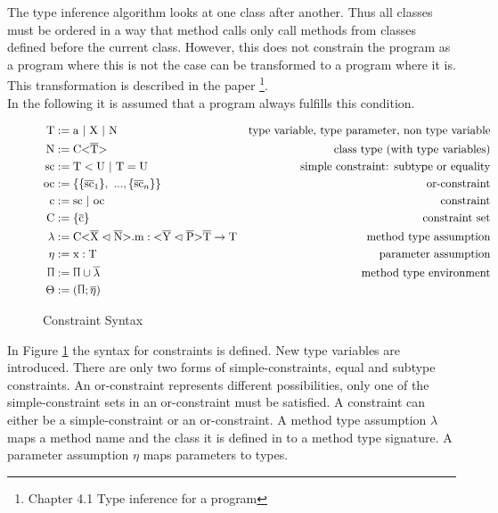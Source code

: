 The type inference algorithm looks at one class after another. Thus all classes must be ordered in a way that method calls only call methods from classes defined before the current class.
However, this does not constrain the program as a program where this is not the case can be transformed to a program where it is.
This transformation is described in the paper \footnote{Chapter 4.1 Type inference for a program}.
\\
In the following it is assumed that a program always fulfills this condition.

\begin{figure}
    \begin{align*}
        \text{T} &:= \text{a} \ | \ \text{X} \ | \ \text{N} &\text{type variable, type parameter, non type variable} \\
        \text{N} &:= \text{C} \vv{\ot{T}} &\text{class type (with type variables)}\\
        \text{sc} &:= \text{T} < \text{U} \ | \ \text{T} = \text{U} &\text{simple constraint: subtype or equality}\\
        \text{oc} &:= \{ \{ \ot{sc}_1 \}, \ ..., \{ \ot{sc}_n \} \} &\text{or-constraint}\\
        \text{c} &:= \text{sc} \ | \ \text{oc} &\text{constraint}\\
        \text{C} &:= \{ \ot{c} \} &\text{constraint set}\\
        \lambda &:= \cm : \yp \oto{\text{T}} &\text{method type assumption}\\
        \eta &:= \text{x} : \text{T} &\text{parameter assumption}\\
        \sprod{0.7} &:= \sprod{0.7} \cup \overline{\lambda} &\text{method type environment}\\
        \Theta &:= ( \sprod{0.7}; \overline{\eta} )
    \end{align*}
    \caption{Constraint Syntax}
    \label{constraint_syntax}
\end{figure}

In Figure \ref{constraint_syntax} the syntax for constraints is defined. New type variables  are introduced. There are only two forms of simple-constraints, equal and subtype constraints. An or-constraint represents different possibilities, only one of the simple-constraint sets in an or-constraint must be satisfied.
A constraint can either be a simple-constraint or an or-constraint. A method type assumption $\lambda$ maps a method name and the class it is defined in to a method type signature. A parameter assumption $\eta$ maps parameters to types.

